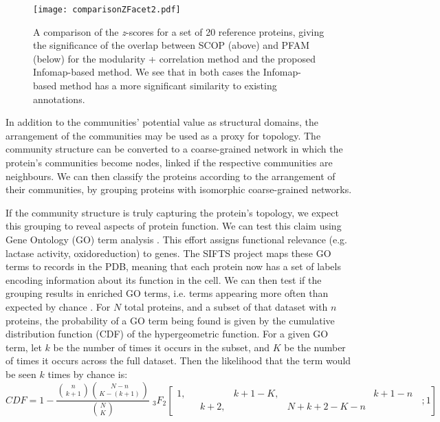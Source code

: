 \documentclass[a4paper,numbib, final, twoside, titelpage]{imaiai}%
\begin{document}
\begin{figure}[h]
\centering
\texttt{[image: comparisonZFacet2.pdf]}
        \caption[zScoreComparison]{A comparison of the \textit{z}-scores for a set of 20 reference proteins, giving the significance of the overlap between SCOP (above) and PFAM (below) for the modularity + correlation method \cite{Hleap13} and the proposed Infomap-based method. We see that in both cases the Infomap-based method has a more significant similarity to existing annotations. }
        \label{fig:fullStats}
\vspace*{10pt}
\end{figure}


In addition to the communities' potential value as structural domains, the arrangement of the communities may be used as a proxy for topology. The community structure can be converted to a coarse-grained network in which the protein's communities become nodes, linked if the respective communities are neighbours. We can then classify the proteins according to the arrangement of their communities, by grouping proteins with isomorphic coarse-grained networks.


If the community structure is truly capturing the protein's topology, we expect this grouping to reveal aspects of protein function. We can test this claim using Gene Ontology (GO) term analysis  \cite{Ashburner00}. This effort assigns functional relevance (e.g. lactase activity, oxidoreduction) to genes. The SIFTS project \cite{Velankar13} maps these GO terms to records in the PDB, meaning that each protein now has a set of labels encoding information about its function in the cell. We can then test if the grouping results in enriched GO terms, i.e. terms appearing more often than expected by chance \cite{Huang08,Rhee08}. For $N$ total proteins, and a subset of that dataset with $n$ proteins, the probability of a GO term being found is given by the cumulative distribution function (CDF) of the hypergeometric function. For a given GO term, let $k$ be the number of times it occurs in the subset, and $K$ be the number of times it occurs across the full dataset. Then the likelihood that the term would be seen $k$ times by chance is:
\begin{equation*}
  CDF = 1 - \frac{{n \choose k+1} {N - n \choose K - (k+1)} }{ {N \choose K} } \; {}_3 F_2 \left[ \begin{matrix}1, \: \: \: & &k+1-K,& &k+1-n\\ &k+2,&&N+k+2-K-n&\end{matrix} \; \; ;1 \right]
\end{equation*}
\end{document}
